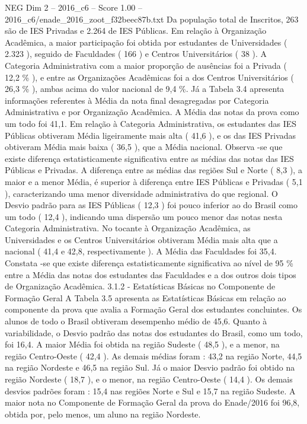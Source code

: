 \begin{textsample}{NEG Dim 2 – 2016\_c6 – Score 1.00 – 2016\_c6/enade\_2016\_zoot\_f32beec87b.txt}
Da população total de Inscritos, 263 são de IES Privadas e 2.264 de IES Públicas.
Em relação à Organização Acadêmica, a maior participação foi obtida por estudantes de Universidades ( 2.323 ), seguido de Faculdades ( 166 ) e Centros Universitários ( 38 ).
A Categoria Administrativa com a maior proporção de ausências foi a Privada ( 12,2 \% ), e entre as Organizações Acadêmicas foi a dos Centros Universitários ( 26,3 \% ), ambas acima do valor nacional de 9,4 \%.
Já a Tabela 3.4 apresenta informações referentes à Média da nota final desagregadas por Categoria Administrativa e por Organização Acadêmica.
A Média das notas da prova como um todo foi 41,1.
Em relação à Categoria Administrativa, os estudantes das IES Públicas obtiveram Média ligeiramente mais alta ( 41,6 ), e os das IES Privadas obtiveram Média mais baixa ( 36,5 ), que a Média nacional.
Observa -se que existe diferença estatisticamente significativa entre as médias das notas das IES Públicas e Privadas.
A diferença entre as médias das regiões Sul e Norte ( 8,3 ), a maior e a menor Média, é superior à diferença entre IES Públicas e Privadas ( 5,1 ), caracterizando uma menor diversidade administrativa do que regional.
O Desvio padrão para as IES Públicas ( 12,3 ) foi pouco inferior ao do Brasil como um todo ( 12,4 ), indicando uma dispersão um pouco menor das notas nesta Categoria Administrativa.
No tocante à Organização Acadêmica, as Universidades e os Centros Universitários obtiveram Média mais alta que a nacional ( 41,4 e 42,8, respectivamente ).
A Média das Faculdades foi 35,4.
Constata -se que existe diferença estatisticamente significativa ao nível de 95 \% entre a Média das notas dos estudantes das Faculdades e a dos outros dois tipos de Organização Acadêmica. 3.1.2 - Estatísticas Básicas no Componente de Formação Geral A Tabela 3.5 apresenta as Estatísticas Básicas em relação ao componente da prova que avalia a Formação Geral dos estudantes concluintes.
Os alunos de todo o Brasil obtiveram desempenho médio de 45,6.
Quanto à variabilidade, o Desvio padrão das notas dos estudantes do Brasil, como um todo, foi 16,4.
A maior Média foi obtida na região Sudeste ( 48,5 ), e a menor, na região Centro-Oeste ( 42,4 ).
As demais médias foram : 43,2 na região Norte, 44,5 na região Nordeste e 46,5 na região Sul.
Já o maior Desvio padrão foi obtido na região Nordeste ( 18,7 ), e o menor, na região Centro-Oeste ( 14,4 ).
Os demais desvios padrões foram : 15,4 nas regiões Norte e Sul e 15,7 na região Sudeste.
A maior nota no Componente de Formação Geral da prova do Enade/2016 foi 96,8, obtida por, pelo menos, um aluno na região Nordeste.

\end{textsample}

